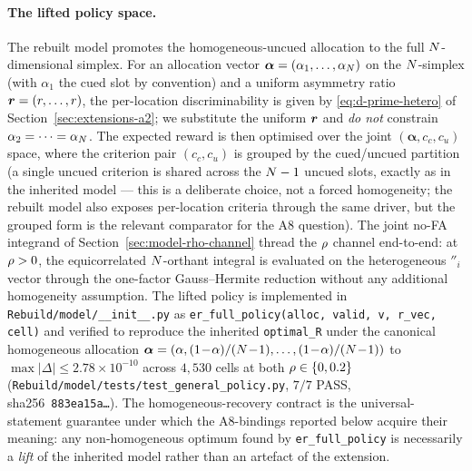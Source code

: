 \paragraph{The lifted policy space.}
The rebuilt model promotes the homogeneous-uncued allocation to the
full $N$-dimensional simplex. For an allocation vector
$\boldsymbol{\alpha} = (\alpha_1, \ldots, \alpha_{N})$ on the
$N$-simplex (with $\alpha_1$ the cued slot by convention) and a
uniform asymmetry ratio $\boldsymbol{r} = (r, \ldots,
r)$, the per-location discriminability is given by
\eqref{eq:d-prime-hetero} of Section~\ref{sec:extensions-a2}; we
substitute the uniform $\boldsymbol{r}$ and \emph{do not}
constrain $\alpha_2 = \cdots = \alpha_{N}$. The expected reward is
then optimised over the joint
$(\boldsymbol{\alpha}, c_c, c_u)$ space, where the criterion pair
$(c_c, c_u)$ is grouped by the cued/uncued partition (a single uncued
criterion is shared across the $N - 1$ uncued slots, exactly as
in the inherited model — this is a deliberate choice, not a forced
homogeneity; the rebuilt model also exposes per-location criteria
through the same driver, but the grouped form is the relevant
comparator for the A8 question). The joint no-FA integrand of
Section~\ref{sec:model-rho-channel} thread the $\rho$ channel
end-to-end: at $\rho > 0$, the equicorrelated $N$-orthant
integral is evaluated on the heterogeneous $\dprime_i$ vector through
the one-factor Gauss--Hermite reduction without any additional
homogeneity assumption. The lifted policy is implemented in
\texttt{Rebuild/model/\_\_init\_\_.py} as
\texttt{er\_full\_policy(alloc, valid, v, r\_vec, cell)} and verified
to reproduce the inherited \texttt{optimal\_R} under the canonical
homogeneous allocation
$\boldsymbol{\alpha} = (\alpha, (1\!-\!\alpha)/(\Nloc\!-\!1), \ldots,
(1\!-\!\alpha)/(\Nloc\!-\!1))$ to $\max|\Delta| \le
2.78\!\times\!10^{-10}$ across $4{,}530$ cells at both $\rho \in
\{0, 0.2\}$
(\texttt{Rebuild/model/tests/}\allowbreak\texttt{test\_general\_policy.py},
$7/7$ PASS, sha256~\texttt{883ea15a\ldots}). The homogeneous-recovery
contract is the universal-statement guarantee under which the
A8-bindings reported below acquire their meaning: any non-homogeneous
optimum found by \texttt{er\_full\_policy} is necessarily a
\emph{lift} of the inherited model rather than an artefact of the
extension.

